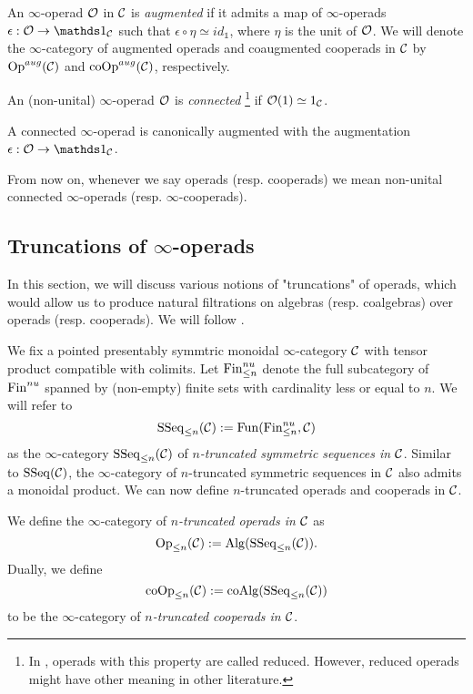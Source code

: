 \begin{definition}
	An $\infty$-operad ${\mathcal{O}}$ in ${\mathcal{C}}$ is \emph{augmented} if it admits a map of $\infty$-operads $\epsilon:\CO\rightarrow \triv_{\CC}$ such that $\epsilon\circ \eta\simeq id_{\mathds{1}}$, where $\eta$ is the unit of ${\mathcal{O}}$. We will denote the $\infty$-category of augmented operads and coaugmented cooperads in ${\mathcal{C}}$ by $\operatorname{Op}^{aug}({\mathcal{C}})$ and $\operatorname{coOp}^{aug}({\mathcal{C}})$, respectively.

\end{definition}

\begin{definition}
	An (non-unital) $\infty$-operad ${\mathcal{O}}$ is \emph{connected} \footnote{In \cite{ChingBar}, operads with this property are called reduced. However, reduced operads might have other meaning in other literature.}  if ${\mathcal{O}}(1)\simeq 1_{{\mathcal{C}}}$. 
\end{definition}
\begin{remark}
A connected $\infty$-operad is canonically augmented with the augmentation $\epsilon:\CO\to \triv_{\CC}$.
\end{remark}  

\begin{remark}
From now on, whenever we say operads (resp. cooperads) we mean non-unital connected $\infty$-operads (resp. $\infty$-cooperads).
\end{remark}


\subsection{Truncations of $\infty$-operads}
In this section, we will discuss various notions of "truncations" of operads, which would allow us to produce natural filtrations on algebras (resp. coalgebras) over operads (resp. cooperads).
We will follow \cite{Heuts_Koszul}.

We fix a pointed presentably symmtric monoidal $\infty$-category ${\mathcal{C}}$ with tensor product compatible with colimits.
Let $\operatorname{Fin}^{nu}_{\leq n}$ denote the full subcategory of $\operatorname{Fin}^{nu}$ spanned by (non-empty) finite sets with cardinality less or equal to $n$.
We will refer to
$$
\operatorname{SSeq}_{\leq n}({\mathcal{C}}):=\operatorname{Fun}(\operatorname{Fin}^{nu}_{\leq n}, {\mathcal{C}})
$$ 
as the $\infty$-category $\operatorname{SSeq}_{\leq n}({\mathcal{C}})$ of \emph{$n$-truncated symmetric sequences in ${\mathcal{C}}$}.
Similar to $\operatorname{SSeq}({\mathcal{C}})$, the $\infty$-category of $n$-truncated symmetric sequences in ${\mathcal{C}}$ also admits a monoidal product.
We can now define $n$-truncated operads and cooperads in ${\mathcal{C}}$.
\begin{definition}
    We define the $\infty$-category of \emph{$n$-truncated operads in ${\mathcal{C}}$} as 
    $$
    \operatorname{Op}_{\leq n}({\mathcal{C}}) :=\operatorname{Alg}(\operatorname{SSeq}_{\leq n}({\mathcal{C}})).
    $$
    Dually, we define 
    $$
     \operatorname{coOp}_{\leq n}({\mathcal{C}}) := \operatorname{coAlg}(\operatorname{SSeq}_{\leq n}({\mathcal{C}})) 
    $$
    to be the $\infty$-category of \emph{$n$-truncated cooperads in ${\mathcal{C}}$}.
\end{definition}


